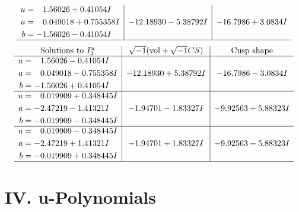 \documentclass[1p]{elsarticle_modified}
\theoremstyle{definition}
\newcommand{\I}{\sqrt{-1}}
\begin{document}
$$\begin{array}{c|c|c}
\begin{aligned}
u &= \phantom{-}1.56026 + 0.41054 I \\
a &= \phantom{-}0.049018 + 0.755358 I \\
b &= -1.56026 - 0.41054 I\end{aligned}
 & -12.18930 - 5.38792 I & -16.7986 + 3.0834 I\\
 \hline 
 \end{array}$$\newpage$$\begin{array}{c|c|c}  
\text{Solutions to }I^u_{3}& \I (\text{vol} + \sqrt{-1}CS) & \text{Cusp shape}\\
 \hline 
\begin{aligned}
u &= \phantom{-}1.56026 - 0.41054 I \\
a &= \phantom{-}0.049018 - 0.755358 I \\
b &= -1.56026 + 0.41054 I\end{aligned}
 & -12.18930 + 5.38792 I & -16.7986 - 3.0834 I \\ \hline\begin{aligned}
u &= \phantom{-}0.019909 + 0.348445 I \\
a &= -2.47219 - 1.41321 I \\
b &= -0.019909 - 0.348445 I\end{aligned}
 & -1.94701 - 1.83327 I & -9.92563 + 5.88323 I \\ \hline\begin{aligned}
u &= \phantom{-}0.019909 - 0.348445 I \\
a &= -2.47219 + 1.41321 I \\
b &= -0.019909 + 0.348445 I\end{aligned}
 & -1.94701 + 1.83327 I & -9.92563 - 5.88323 I\\
 \hline 
 \end{array}$$\newpage
\newpage\renewcommand{\arraystretch}{1}
\centering \section*{ IV. u-Polynomials}
\end{document}
